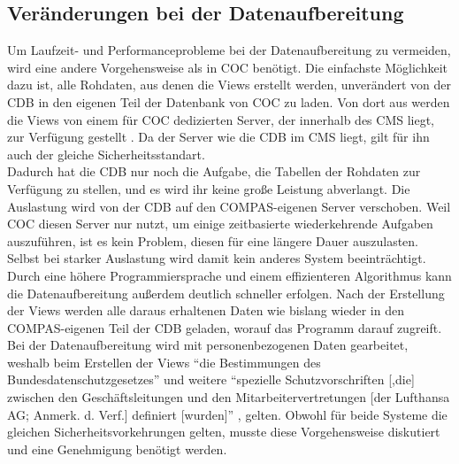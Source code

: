 \documentclass [12pt, a4paper, oneside, titlepage, ngerman]{article}
\begin{document}
\subsection{Veränderungen bei der Datenaufbereitung}
Um Laufzeit- und Performanceprobleme bei der Datenaufbereitung zu vermeiden, wird eine andere Vorgehensweise als in \ac{COC} benötigt. Die einfachste Möglichkeit dazu ist, alle Rohdaten, aus denen die Views erstellt werden, unverändert von der \ac{CDB} in den eigenen Teil der Datenbank von \ac{COC} zu laden. Von dort aus werden die Views von einem für \ac{COC} dedizierten Server, der innerhalb des \ac{CMS} liegt, zur Verfügung gestellt \cite[vgl. dazu][]{Gespraech5}. Da der Server wie die \ac{CDB} im \ac{CMS} liegt, gilt für ihn auch der gleiche Sicherheitsstandart.\\
Dadurch hat die \ac{CDB} nur noch die Aufgabe, die Tabellen der Rohdaten zur Verfügung zu stellen, und es wird ihr keine große Leistung abverlangt. Die Auslastung wird von der \ac{CDB} auf den COMPAS-eigenen Server verschoben. Weil \ac{COC} diesen Server nur nutzt, um einige zeitbasierte wiederkehrende Aufgaben auszuführen, ist es kein Problem, diesen für eine längere Dauer auszulasten. Selbst bei starker Auslastung wird damit kein anderes System beeinträchtigt. Durch eine höhere Programmiersprache und einem effizienteren Algorithmus kann die Datenaufbereitung außerdem deutlich schneller erfolgen. Nach der Erstellung der Views werden alle daraus erhaltenen Daten wie bislang wieder in den COMPAS-eigenen Teil der \ac{CDB} geladen, worauf das Programm darauf zugreift. \\

\noindent Bei der Datenaufbereitung wird mit personenbezogenen Daten gearbeitet, weshalb beim Erstellen der Views "`die Bestimmungen des Bundesdatenschutzgesetzes"' \cite[S.6]{CMS} und weitere "`spezielle Schutzvorschriften [,die] zwischen den Geschäftsleitungen und den Mitarbeitervertretungen [der Lufthansa AG; Anmerk. d. Verf.] definiert [wurden]"' \cite[S.6]{CMS}, gelten. Obwohl für beide Systeme die gleichen Sicherheitsvorkehrungen gelten, musste diese Vorgehensweise diskutiert und eine Genehmigung benötigt werden. 
\end{document}
